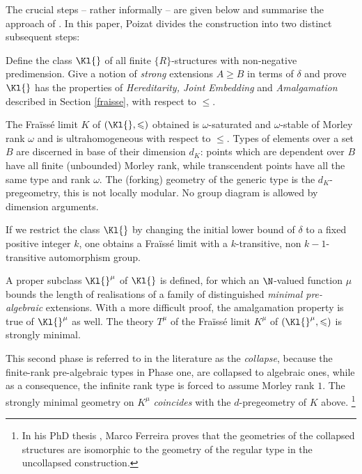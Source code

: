 The crucial steps -- rather informally -- are given below and summarise the approach of \cite{jbg}. In this paper, Poizat
divides the construction into two distinct subsequent steps:
\begin{itemize}
Define the class $\Kl{}$ of all finite $\{R\}$-structures with non-negative predimension.
Give a notion of {\em strong} %
extensions $A\geqslant B$ in terms of $\delta$ and prove $\Kl{}$ has the properties %
of {\em Hereditarity, Joint Embedding} and {\em Amalgamation}
described in Section \ref{fraisse}, with respect to $\leqslant$.

The Fra\"iss\'e limit $K$ of $(\Kl{},\leqslant)$ obtained is $\omega$-saturated and $\omega$-stable of Morley rank $\omega$ and is
ultrahomogeneous with respect to $\leqslant$.
Types of elements over a set $B$ are discerned in base of their dimension $d_{K}$: points
which are dependent over $B$ have all finite (unbounded) Morley rank, while transcendent points have all the same type and
rank $\omega$.
The (forking) geometry of the generic type is the $d_{K}$-pregeometry,
this is not locally modular.
No group diagram is allowed by dimension arguments.

If we restrict the class $\Kl{}$ by changing the initial lower bound of $\delta$ to a fixed positive integer $k$, one obtains a Fra\"iss\'e
limit with a $k$-transitive, non $k-1$-transitive automorphism group.

 A proper subclass $\Kl{}^{\mu}$ of $\Kl{}$ is defined, for which an $\N$-valued function $\mu$
bounds the length of realisations of a family of distinguished {\em minimal pre-algebraic} extensions. With a more difficult proof,
the amalgamation property is true of $\Kl{}^{\mu}$ as well.
The theory $T^{\mu}$ of the Fra\"iss\'e limit  $K^{\mu}$ of $(\Kl{}^{\mu},\leqslant)$ is strongly minimal.

This second phase is referred to in the literature as the {\em collapse}, because the
finite-rank pre-algebraic types in Phase one, are collapsed to algebraic ones, while as a consequence,
the infinite rank type is forced to assume Morley rank $1$. The strongly
minimal geometry on $K^{\mu}$ {\em coincides} with the $d$-pregeometry of $K$ above.
\footnote{In his PhD thesis \cite{fer}, Marco Ferreira proves that the geometries of the collapsed structures are isomorphic to the geometry of the regular type in the uncollapsed construction.}
\end{itemize}

